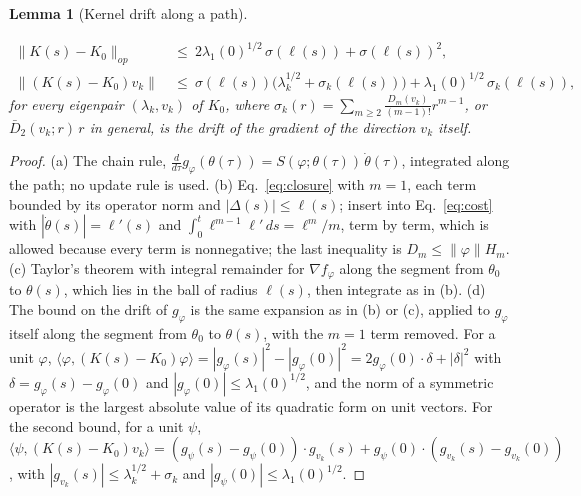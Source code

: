 \documentclass[11pt]{article}
\newtheorem{lemma}{Lemma}
\theoremstyle{definition}
\theoremstyle{remark}
\newcommand{\ip}[2]{\langle #1,#2\rangle}
\begin{document}
\begin{lemma}[Kernel drift along a path]
\begin{enumerate}[label=(\alph*)]
\begin{equation}\label{eq:Kdrift}
\begin{aligned}
\|K(s) - K_0\|_{op}\ &\le\ 2\lambda_1(0)^{1/2}\,\sigma(\ell(s)) + \sigma(\ell(s))^2 ,\\
\|(K(s) - K_0)v_k\|\ &\le\ \sigma(\ell(s))\big(\lambda_k^{1/2} + \sigma_k(\ell(s))\big) + \lambda_1(0)^{1/2}\,\sigma_k(\ell(s)),
\end{aligned}
\end{equation}
for every eigenpair $(\lambda_k, v_k)$ of $K_0$, where $\sigma_k(r) = \sum_{m\ge2}\frac{D_m(v_k)}{(m-1)!}r^{m-1}$, or $\bar D_2(v_k;r)\,r$ in general, is the drift of the gradient of the direction $v_k$ itself.
\end{enumerate}
\end{lemma}

\begin{proof}
(a) The chain rule, $\frac{d}{d\tau}g_\varphi(\theta(\tau)) = S(\varphi;\theta(\tau))\,\dot\theta(\tau)$, integrated along the path; no update rule is used.
(b) Eq.~\eqref{eq:closure} with $m = 1$, each term bounded by its operator norm and $|\Delta(s)|\le\ell(s)$; insert into Eq.~\eqref{eq:cost} with $|\dot\theta(s)| = \ell'(s)$ and $\int_0^t\ell^{m-1}\ell'\,ds = \ell^m/m$, term by term, which is allowed because every term is nonnegative; the last inequality is $D_m\le\|\varphi\|H_m$.
(c) Taylor's theorem with integral remainder for $\nabla f_\varphi$ along the segment from $\theta_0$ to $\theta(s)$, which lies in the ball of radius $\ell(s)$, then integrate as in (b).
(d) The bound on the drift of $g_\varphi$ is the same expansion as in (b) or (c), applied to $g_\varphi$ itself along the segment from $\theta_0$ to $\theta(s)$, with the $m = 1$ term removed.
For a unit $\varphi$, $\ip{\varphi}{(K(s) - K_0)\varphi} = |g_\varphi(s)|^2 - |g_\varphi(0)|^2 = 2g_\varphi(0)\cdot\delta + |\delta|^2$ with $\delta = g_\varphi(s) - g_\varphi(0)$ and $|g_\varphi(0)|\le\lambda_1(0)^{1/2}$, and the norm of a symmetric operator is the largest absolute value of its quadratic form on unit vectors.
For the second bound, for a unit $\psi$, $\ip{\psi}{(K(s) - K_0)v_k} = (g_\psi(s) - g_\psi(0))\cdot g_{v_k}(s) + g_\psi(0)\cdot(g_{v_k}(s) - g_{v_k}(0))$, with $|g_{v_k}(s)|\le\lambda_k^{1/2} + \sigma_k$ and $|g_\psi(0)|\le\lambda_1(0)^{1/2}$.
\end{proof}
\end{document}
